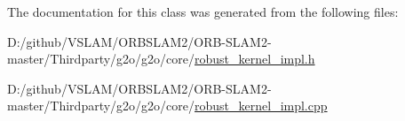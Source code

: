The documentation for this class was generated from the following files\+:\begin{DoxyCompactItemize}
\item 
D\+:/github/\+V\+S\+L\+A\+M/\+O\+R\+B\+S\+L\+A\+M2/\+O\+R\+B-\/\+S\+L\+A\+M2-\/master/\+Thirdparty/g2o/g2o/core/\mbox{\hyperlink{robust__kernel__impl_8h}{robust\+\_\+kernel\+\_\+impl.\+h}}\item 
D\+:/github/\+V\+S\+L\+A\+M/\+O\+R\+B\+S\+L\+A\+M2/\+O\+R\+B-\/\+S\+L\+A\+M2-\/master/\+Thirdparty/g2o/g2o/core/\mbox{\hyperlink{robust__kernel__impl_8cpp}{robust\+\_\+kernel\+\_\+impl.\+cpp}}\end{DoxyCompactItemize}
